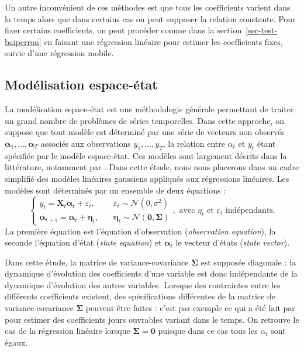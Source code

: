 \documentclass[
  a4paper,
  DIV=11,
  numbers=noendperiod,
  french]{scrartcl}
\newcommand\1{{\mathds 1}}
\newcommand{\bf}[1]{{\boldsymbol #1}}
\theoremstyle{remark}
\begin{document}
Un autre inconvénient de ces méthodes est que tous les coefficients
varient dans la temps alors que dans certains cas on peut supposer la
relation constante. Pour fixer certains coefficients, on peut procéder
comme dans la section~\ref{sec-test-baiperron} en faisant une régression
linéaire pour estimer les coefficients fixes, suivie d'une régression
mobile.

\subsection{Modélisation espace-état}\label{sec-ssm}

La modélisation espace-état est une méthodologie générale permettant de
traiter un grand nombre de problèmes de séries temporelles. Dans cette
approche, on suppose que tout modèle est déterminé par une série de
vecteurs non observés \(\bf \alpha_1,\dots,\bf\alpha_T\) associés aux
observations \(y_1,\dots,y_T\), la relation entre \(\alpha_t\) et
\(y_t\) étant spécifiée par le modèle espace-état. Ces modèles sont
largement décrits dans la littérature, notamment par
\textcite{durbinkoopman}. Dans cette étude, nous nous placerons dans un
cadre simplifié des modèles linéaires gaussiens appliqués aux
régressions linéaires. Les modèles sont déterminés par un ensemble de
deux équations : \[
\begin{cases}
y_t={\bf X_t}\bf\alpha_t+\varepsilon_t,\quad&\varepsilon_t\sim\mathcal N(0,\sigma^2)\\
\bf\alpha_{t+1}=\bf\alpha_t+\bf\eta_t,\quad&\bf\eta_t\sim\mathcal N(\bf 0,\bf\Sigma)
\end{cases},\text{ avec }\eta_t\text{ et }\varepsilon_t\text{ indépendants.}
\] La première équation est l'équation d'observation (\emph{observation
equation}), la seconde l'équation d'état (\emph{state equation}) et
\(\bf\alpha_t\) le vecteur d'états (\emph{state vector}).

Dans cette étude, la matrice de variance-covariance \(\bf\Sigma\) est
supposée diagonale : la dynamique d'évolution des coefficients d'une
variable est donc indépendante de la dynamique d'évolution des autres
variables. Lorsque des contraintes entre les différents coefficients
existent, des spécifications différentes de la matrice de
variance-covariance \(\bf\Sigma\) peuvent être faites : c'est par
exemple ce qui a été fait par \textcite{abs2006} pour estimer des
coefficients jours ouvrables variant dans le temps. On retrouve le cas
de la régression linéaire lorsque \(\bf\Sigma=\bf 0\) puisque dans ce
cas tous les \(\alpha_t\) sont égaux.
\end{document}
